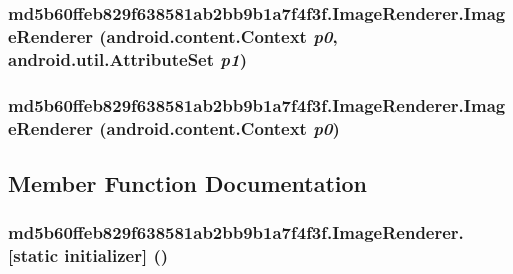 \hypertarget{classmd5b60ffeb829f638581ab2bb9b1a7f4f3f_1_1_image_renderer_b5e414dafd0a921bee8ec84d29ab22e0}{
\subsubsection[{ImageRenderer}]{\setlength{\rightskip}{0pt plus 5cm}md5b60ffeb829f638581ab2bb9b1a7f4f3f.ImageRenderer.ImageRenderer (android.content.Context {\em p0}, \/  android.util.AttributeSet {\em p1})}}
\label{classmd5b60ffeb829f638581ab2bb9b1a7f4f3f_1_1_image_renderer_b5e414dafd0a921bee8ec84d29ab22e0}


\hypertarget{classmd5b60ffeb829f638581ab2bb9b1a7f4f3f_1_1_image_renderer_8333cb061f46b6e67de6bd4d64f2f84d}{
\subsubsection[{ImageRenderer}]{\setlength{\rightskip}{0pt plus 5cm}md5b60ffeb829f638581ab2bb9b1a7f4f3f.ImageRenderer.ImageRenderer (android.content.Context {\em p0})}}
\label{classmd5b60ffeb829f638581ab2bb9b1a7f4f3f_1_1_image_renderer_8333cb061f46b6e67de6bd4d64f2f84d}




\subsection{Member Function Documentation}
\hypertarget{classmd5b60ffeb829f638581ab2bb9b1a7f4f3f_1_1_image_renderer_6be205050fb3dc45d4497cae1eb7831a}{
\subsubsection[{[static initializer]}]{\setlength{\rightskip}{0pt plus 5cm}md5b60ffeb829f638581ab2bb9b1a7f4f3f.ImageRenderer.\mbox{[}static initializer\mbox{]} ()}}
\label{classmd5b60ffeb829f638581ab2bb9b1a7f4f3f_1_1_image_renderer_6be205050fb3dc45d4497cae1eb7831a}




